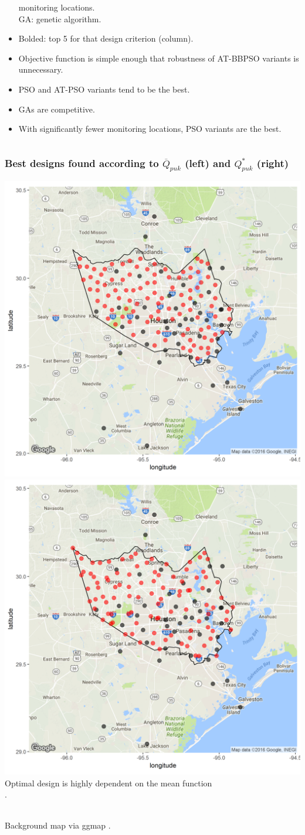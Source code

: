\documentclass[xcolor=dvipsnames]{beamer}
\begin{document}
\begin{frame}
\begin{columns}
\begin{column}{0.55\textwidth}
\begin{itemize}
\hspace{1.42cm} monitoring locations.\\
GA: genetic algorithm.
\item Bolded: top 5 for that design criterion (column).\pause
\item Objective function is simple enough that robustness of AT-BBPSO variants is unnecessary.\pause
\item PSO and AT-PSO variants tend to be the best.
\item GAs are competitive. \pause
\item With significantly fewer monitoring locations, PSO variants are the best.
  \end{itemize}
\end{column}
\end{columns}
\end{frame}

\begin{frame}
\frametitle{Best designs found according to $\overline{Q}_{puk}$ (left) and $Q^*_{puk}$ (right)}
{\centering
\includegraphics[width=.49\textwidth]{../doc/sig2pukmean.png}
\includegraphics[width=.49\textwidth]{../doc/sig2pukmax.png}
}\\
Optimal design is highly dependent on the mean function\\ \citep*{zimmerman2006optimal}.\\~

Background map via ggmap \citep*{ggmap2013}.

\end{frame}
\end{document}
